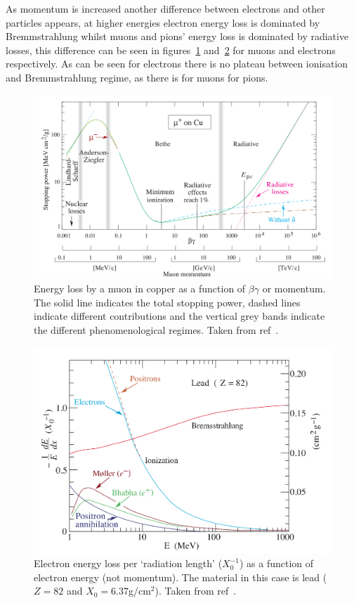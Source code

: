 As momentum is increased another difference between electrons and other particles appears, at higher energies electron energy loss is dominated by Bremmstrahlung whilst muons and pions' energy loss is dominated by radiative losses, this difference can be seen in figures~\ref{fig:mu-pi-bethe} and~\ref{fig:electron_energy_loss} for muons and electrons respectively. As can be seen for electrons there is no plateau between ionisation and Bremmstrahlung regime, as there is for muons for pions.  
\begin{figure}[hptb] 
  \centering
    \includegraphics[width=.9\textwidth]{images/mu-pi-bethe.png}
  \caption{Energy loss by a muon in copper as a function of \( \beta \gamma \) or momentum. The solid line indicates the total stopping power, dashed lines indicate different contributions and the vertical grey bands indicate the different phenomenological regimes. Taken from ref~\cite{pdg}.}
  \label{fig:mu-pi-bethe}
\end{figure}
\begin{figure}[hptb]
  \centering  
    \includegraphics[width=.9\textwidth]{images/electron_energy_loss.png}
  \caption{Electron energy loss per `radiation length' (\( X_0^{-1} \)) as a function of electron energy (not momentum). The material in this case is lead (\(Z=82\) and \(X_0 = 6.37\)g/cm\(^2\)). Taken from ref~\cite{pdg}.}
  \label{fig:electron_energy_loss}
\end{figure}

